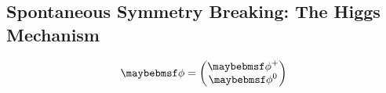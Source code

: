 % 

\subsection{Spontaneous Symmetry Breaking: The Higgs Mechanism}

% 
 
\begin{equation}
\phi = 
\everymath{\displaystyle} \begin{pmatrix}
\phi^{+} \\ 
\phi^{0}
\end{pmatrix}
\end{equation}

